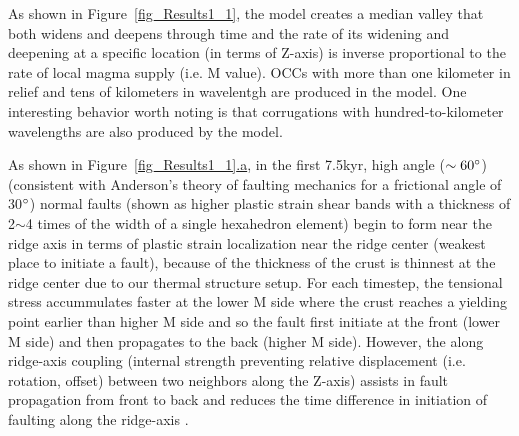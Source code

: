 As shown in Figure~\hyperref[fig_Results1_1]{\ref{fig_Results1_1}}, the model creates a median valley that both widens and deepens through time and the rate of its widening and deepening at a specific location (in terms of Z-axis) is inverse proportional to the rate of local magma supply (i.e. M value). OCCs with more than one kilometer in relief and tens of kilometers in wavelentgh are produced in the model. One interesting behavior worth noting is that corrugations with hundred-to-kilometer wavelengths are also produced by the model.

As shown in Figure~\hyperref[fig_Results1_1]{\ref{fig_Results1_1}.a}, in the first 7.5kyr, high angle ($\sim 60 \degree$)(consistent with  Anderson's theory of faulting mechanics for a frictional angle of 30$\degree$) normal faults (shown as higher plastic strain shear bands with a thickness of 2$\sim$4 times of the width of a single hexahedron element) begin to form near the ridge axis in terms of plastic strain localization near the ridge center (weakest place to initiate a fault), because of the thickness of the crust is thinnest at the ridge center due to our thermal structure setup. For each timestep, the tensional stress accummulates faster at the lower M side where the crust reaches a yielding point earlier than higher M side and so the fault first initiate at the front (lower M side) and then propagates to the back (higher M side). However, the along ridge-axis coupling (internal strength preventing relative displacement (i.e. rotation, offset) between two neighbors along the Z-axis) assists in fault propagation from front to back and reduces the time difference in initiation of faulting along the ridge-axis .  

